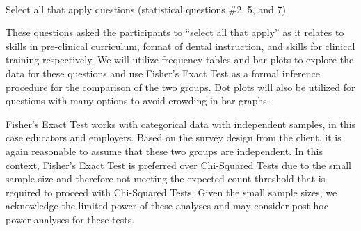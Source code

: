 \documentclass[
  11pt,
  letterpaper,
  DIV=11,
  numbers=noendperiod]{scrartcl}
\makeatletter
\let\oldparagraph\paragraph
\renewcommand{\paragraph}{
    \@ifstar
      \xxxParagraphStar
      \xxxParagraphNoStar
  }
\newcommand{\xxxParagraphStar}[1]{\oldparagraph*{#1}\mbox{}}
\newcommand{\xxxParagraphNoStar}[1]{\oldparagraph{#1}\mbox{}}
\numberwithin{figure}{section}
\makeatother
\begin{document}
\paragraph{Select all that apply questions (statistical questions \#2,
5, and
7)}\label{select-all-that-apply-questions-statistical-questions-2-5-and-7}

These questions asked the participants to ``select all that apply'' as
it relates to skills in pre-clinical curriculum, format of dental
instruction, and skills for clinical training respectively. We will
utilize frequency tables and bar plots to explore the data for these
questions and use Fisher's Exact Test as a formal inference procedure
for the comparison of the two groups. Dot plots will also be utilized
for questions with many options to avoid crowding in bar graphs.

Fisher's Exact Test works with categorical data with independent
samples, in this case educators and employers. Based on the survey
design from the client, it is again reasonable to assume that these two
groups are independent. In this context, Fisher's Exact Test is
preferred over Chi-Squared Tests due to the small sample size and
therefore not meeting the expected count threshold that is required to
proceed with Chi-Squared Tests. Given the small sample sizes, we
acknowledge the limited power of these analyses and may consider post
hoc power analyses for these tests.
\end{document}
